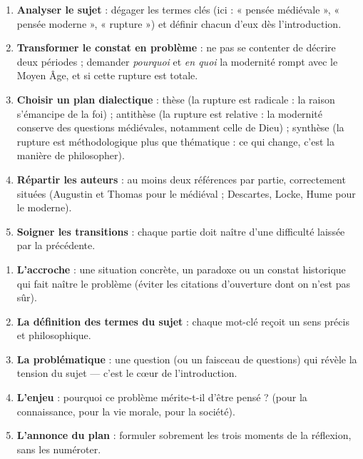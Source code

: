 \documentclass[11pt]{article}
\begin{document}
\begin{methode}
\begin{enumerate}
\item \textbf{Analyser le sujet} : dégager les termes clés (ici : « pensée médiévale », « pensée moderne », « rupture ») et définir chacun d'eux dès l'introduction.
\item \textbf{Transformer le constat en problème} : ne pas se contenter de décrire deux périodes ; demander \emph{pourquoi} et \emph{en quoi} la modernité rompt avec le Moyen Âge, et si cette rupture est totale.
\item \textbf{Choisir un plan dialectique} : thèse (la rupture est radicale : la raison s'émancipe de la foi) ; antithèse (la rupture est relative : la modernité conserve des questions médiévales, notamment celle de Dieu) ; synthèse (la rupture est méthodologique plus que thématique : ce qui change, c'est la manière de philosopher).
\item \textbf{Répartir les auteurs} : au moins deux références par partie, correctement situées (Augustin et Thomas pour le médiéval ; Descartes, Locke, Hume pour le moderne).
\item \textbf{Soigner les transitions} : chaque partie doit naître d'une difficulté laissée par la précédente.
\end{enumerate}
\end{methode}

\begin{methode}
\begin{enumerate}
\item \textbf{L'accroche} : une situation concrète, un paradoxe ou un constat historique qui fait naître le problème (éviter les citations d'ouverture dont on n'est pas sûr).
\item \textbf{La définition des termes du sujet} : chaque mot-clé reçoit un sens précis et philosophique.
\item \textbf{La problématique} : une question (ou un faisceau de questions) qui révèle la tension du sujet — c'est le cœur de l'introduction.
\item \textbf{L'enjeu} : pourquoi ce problème mérite-t-il d'être pensé ? (pour la connaissance, pour la vie morale, pour la société).
\item \textbf{L'annonce du plan} : formuler sobrement les trois moments de la réflexion, sans les numéroter.
\end{enumerate}
\end{methode}
\end{document}
